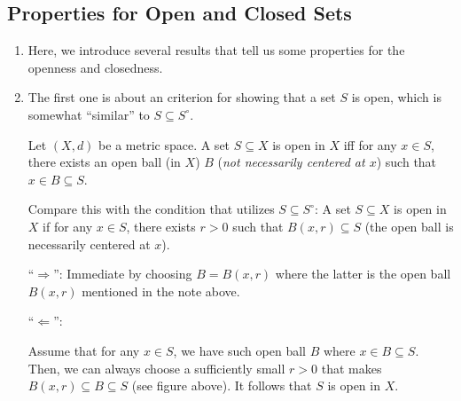 \subsection{Properties for Open and Closed Sets}
\begin{enumerate}
\item Here, we introduce several results that tell us some properties for the
openness and closedness.
\item The first one is about an criterion for showing that a set
\(S\) is open, which is somewhat ``similar'' to \(S\subseteq S^{\circ}\).
\begin{proposition}
\label{prp:open-set-exist-open-ball}
Let \((X,d)\) be a metric space. A set \(S\subseteq X\) is open in \(X\) iff
for any \(x\in S\), there exists an open ball (in \(X\)) \(B\) (\emph{not
necessarily centered at \(x\)}) such that \(x\in B\subseteq S\).

\begin{note}
Compare this with the condition that utilizes \(S\subseteq S^{\circ}\): A set
\(S\subseteq X\) is open in \(X\) if for any \(x\in S\), there exists \(r>0\)
such that \(B(x,r)\subseteq S\) (the open ball is necessarily centered at \(x\)).
\end{note}

\begin{pf}
``\(\Rightarrow\)'': Immediate by choosing \(B=B(x,r)\) where the latter is the
open ball \(B(x,r)\) mentioned in the note above.

``\(\Leftarrow\)'': 
\begin{center}
\end{center}
Assume that for any \(x\in S\), we have such open ball \(B\) where \(x\in
B\subseteq S\). Then, we can always choose a sufficiently small \(r>0\) that
makes \(B(x,r)\subseteq B\subseteq S\) (see figure above). It follows that
\(S\) is open in \(X\).
\end{pf}
\end{proposition}


\end{enumerate}
